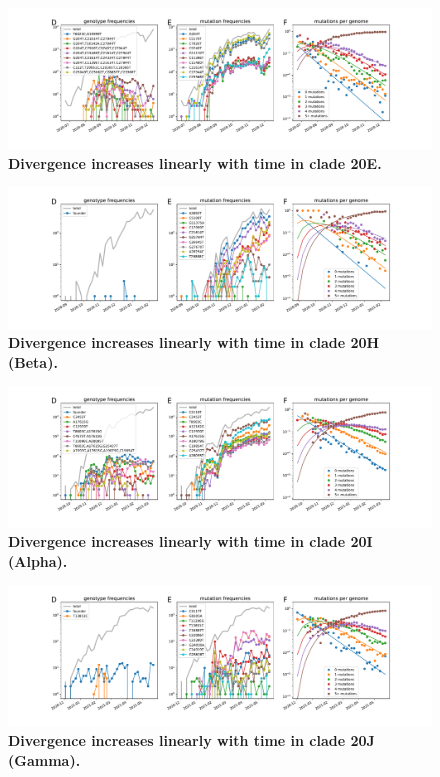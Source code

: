 \begin{figure}
    \includegraphics[width=\textwidth]{figures/counts/20E_counts.pdf}
    \caption{{\bf Divergence increases linearly with time in clade 20E.}
    \label{fig:20E_counts}}
\end{figure}

\begin{figure}
    \includegraphics[width=\textwidth]{figures/counts/20H_counts.pdf}
    \caption{{\bf Divergence increases linearly with time in clade 20H (Beta).}
    \label{fig:20H_counts}}
\end{figure}

\begin{figure}
    \includegraphics[width=\textwidth]{figures/counts/20I_counts.pdf}
    \caption{{\bf Divergence increases linearly with time in clade 20I (Alpha).}
    \label{fig:20I_counts}}
\end{figure}

\begin{figure}
    \includegraphics[width=\textwidth]{figures/counts/20J_counts.pdf}
    \caption{{\bf Divergence increases linearly with time in clade 20J (Gamma).}
    \label{fig:20J_counts}}
\end{figure}


